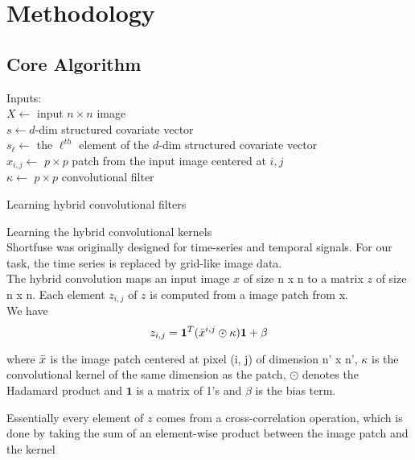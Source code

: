 \documentclass[12pt]{article}
\begin{document}
\section{Methodology}

\subsection{Core Algorithm}
\begin{algorithm}[H]
\SetAlgoLined
 Inputs: \\
 $X \leftarrow$ input $n \times n$ image \\
 $s \leftarrow d$-dim structured covariate vector\\
 $s_\ell \leftarrow$ the $\ell^{th}$ element of the $d$-dim structured covariate vector\\
 $x_{i,j} \leftarrow$ $p \times p$ patch from the input image centered at $i,j$ \\
 $\kappa \leftarrow$ $p \times p$ convolutional filter \\ 
\caption{Learning hybrid convolutional filters}
\end{algorithm}

Learning the hybrid convolutional kernels \\

Shortfuse was originally designed for time-series and temporal signals. For our task, the time series is replaced by grid-like image data.\\

The hybrid convolution maps an input image $x$ of size n x n to a matrix $z$ of size n x n. Each element $z_{i, j}$ of $z$ is computed from a image patch from x. \\

We have $$z_{i, j} = \mathbf{1}^T(\Bar{x}^{i, j} \odot \kappa)\mathbf{1} + \beta$$

where $\Bar{x}$ is the image patch centered at pixel (i, j) of dimension n' x n', $\kappa$ is the convolutional kernel of the same dimension as the patch, $\odot$ denotes the Hadamard product and $\mathbf{1}$ is a matrix of 1's and $\beta$ is the bias term.  

Essentially every element of $z$ comes from a cross-correlation operation, which is done by taking the sum of an element-wise product between the image patch and the kernel
\end{document}
